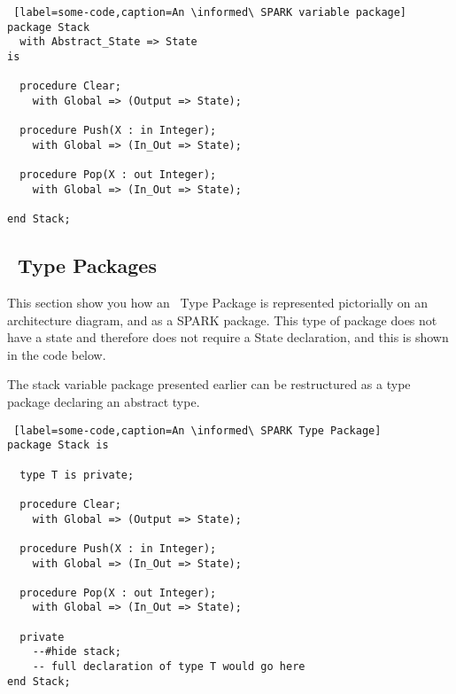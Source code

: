 \begin{lstlisting} [label=some-code,caption=An \informed\ SPARK variable package]
package Stack
  with Abstract_State => State
is

  procedure Clear;
    with Global => (Output => State);

  procedure Push(X : in Integer);
    with Global => (In_Out => State);

  procedure Pop(X : out Integer);
    with Global => (In_Out => State);

end Stack;
\end{lstlisting}


\subsection{\informed\ Type Packages}

\noindent\parbox[][][t]{.2\linewidth}{
    }%
 \parbox[][][t]{.8\linewidth}{

This section show you how an \informed\ Type Package is represented pictorially on an architecture
diagram, and as a SPARK package. This type of package does not have a state and therefore does not
require a State declaration, and this is shown in the code below.
}

The stack variable package presented earlier can be restructured as a type package declaring an
abstract type.

\begin{lstlisting} [label=some-code,caption=An \informed\ SPARK Type Package]
package Stack is

  type T is private;

  procedure Clear;
    with Global => (Output => State);

  procedure Push(X : in Integer);
    with Global => (In_Out => State);

  procedure Pop(X : out Integer);
    with Global => (In_Out => State);

  private
    --#hide stack;
    -- full declaration of type T would go here
end Stack;
\end{lstlisting}


